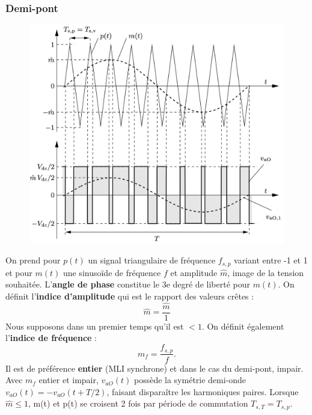		\subsubsection{Demi-pont}
			\begin{figure}
			\vspace{-5mm}
			\includegraphics[scale=0.28]{ch4/17}
			\end{figure}
			On prend pour $p(t)$ un signal triangulaire de fréquence $f_{s,p}$ variant entre -1 et 1 et pour $m(t)$ une sinusoïde de fréquence $f$ et amplitude $\hat{m}$, image de la tension souhaitée. L'\textbf{angle de phase} constitue le 3e degré de liberté pour $m(t)$. On définit l'\textbf{indice d'amplitude} qui est le rapport des valeurs crêtes :
			\begin{equation}
				\hat{m} = \frac{\hat{m}}{1}
			\end{equation}
			Nous supposons dans un premier temps qu'il est $<1$. On définit également l'\textbf{indice de fréquence} : 
			\begin{equation}
				m_f = \frac{f_{s,p}}{f}.
			\end{equation}
			Il est de préférence \textbf{entier} (MLI synchrone) et dans le cas du demi-pont, impair. Avec $m_f$ entier et impair, $v_{aO}(t)$ possède la symétrie demi-onde $v_{aO}(t) = - v_{aO}(t+T/2)$, faisant disparaître les harmoniques paires. Lorsque $\hat{m}\leq 1$, m(t) et p(t) se croisent 2 fois par période de commutation $T_{s,T} = T_{s,p}$.\\
			
